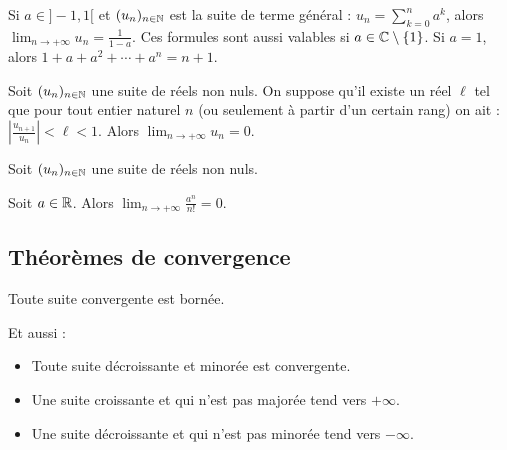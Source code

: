 \documentclass[10pt,class=article,crop=false]{standalone}
\begin{document}
\begin{multicols}{2}
\begin{proposition}
\end{proposition}


	Si $a\in {}]-1,1[$ et $(u_n)_{n\in \mathbb{N}}$ est la suite de terme général :
	$u_n= \sum_{k=0}^na^k$, alors $\lim_{n\to +\infty} u_n= \frac{1}{1-a}$.	
	Ces formules sont aussi valables si $a\in \mathbb{C}\setminus\{1\}$.
	Si $a=1$, alors $1+a+a^2+\cdots+a^n=n+1$.




\begin{theoreme}
	Soit  $(u_n)_{n\in \mathbb{N}}$ une suite de réels non nuls. On suppose qu'il existe un réel $\ell$
	tel que pour tout entier naturel $n$ (ou seulement à partir d'un certain rang) on ait :
	$ \left | \frac{u_{n+1}}{u_n}\right |  <\ell<1.$
	Alors $\lim_{n\to +\infty} u_n= 0$.	
\end{theoreme}



\begin{corollaire}
	Soit  $(u_n)_{n\in \mathbb{N}}$ une suite de réels non nuls.
\end{corollaire}

\begin{exemple}
	Soit $a\in \mathbb{R}$. Alors $\lim_{n\to +\infty} \frac{a^n}{n!} =0$.
\end{exemple}





\subsection{Théorèmes de convergence}


\begin{proposition}
	Toute suite convergente est bornée.
\end{proposition}


\begin{theoreme}
	\label{thm:suite_croiss_maj}
	\sauteligne
\end{theoreme}

\begin{remarque*}
	Et aussi :
	\begin{itemize}
		\item Toute suite décroissante et minorée est convergente.
		\item Une suite croissante et qui n'est pas majorée tend vers $+\infty$.
		\item Une suite décroissante et qui n'est pas minorée tend vers $-\infty$.
	\end{itemize}
\end{remarque*}



\end{multicols}
\end{document}
